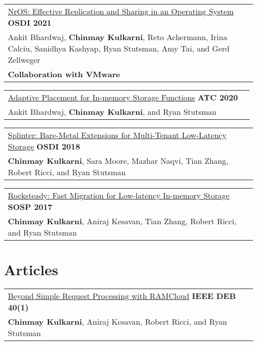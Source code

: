 \documentclass[margin,line]{res}
\begin{document}
\begin{resume}
 \vspace{-7pt}
 \begin{tabular}{@{}p{5.5in}p{4in}}
 \href{https://research.vmware.com/projects/bespin}{NrOS: Effective
 Replication and Sharing in an Operating System} \hfill
 {\small\bf OSDI 2021}\\
 {\small Ankit Bhardwaj, {\bf Chinmay Kulkarni}, Reto Achermann, Irina
  Calciu, Sanidhya Kashyap, Ryan Stutsman, Amy Tai, and Gerd Zellweger}\\
 {\small\bf Collaboration with VMware}\\
 \end{tabular}

 \vspace{-7pt}
 \begin{tabular}{@{}p{5.5in}p{4in}}
 \href{http://utah.systems/projects/kulkarni\_splinter}{Adaptive
 Placement for In-memory Storage Functions} \hfill
 {\small\bf ATC 2020}\\
 {\small Ankit Bhardwaj, {\bf Chinmay Kulkarni}, and Ryan Stutsman}\\
 \end{tabular}

 \vspace{-7pt}
 \begin{tabular}{@{}p{5.5in}p{4in}}
 \href{http://utah.systems/projects/kulkarni\_splinter}{Splinter:
 Bare-Metal Extensions for Multi-Tenant Low-Latency Storage} \hfill
 {\small\bf OSDI 2018}\\
 {\small{\bf Chinmay Kulkarni}, Sara Moore, Mazhar Naqvi, Tian Zhang, Robert
 Ricci, and Ryan Stutsman}\\
 \end{tabular}

 \vspace{-7pt}
 \begin{tabular}{@{}p{5.5in}p{4in}}
 \href{http://utah.systems/projects/kulkarni\_rocksteady}{Rocksteady: Fast
 Migration for Low-latency In-memory Storage} \hfill
 {\small\bf SOSP 2017}\\
 {\small{\bf Chinmay Kulkarni}, Aniraj Kesavan, Tian Zhang, Robert
 Ricci, and Ryan Stutsman}\\
 \end{tabular}

\section{\sc Articles}
\begin{tabular}{@{}p{5.5in}p{4in}}
\href{http://sites.computer.org/debull/A17mar/p62.pdf}{Beyond Simple
Request Processing with RAMCloud} \hfill
{\small\bf IEEE DEB 40(1)}\\
{\small {\bf Chinmay Kulkarni}, Aniraj Kesavan, Robert Ricci, and Ryan
Stutsman}\\
\end{tabular}


\end{resume}
\end{document}
